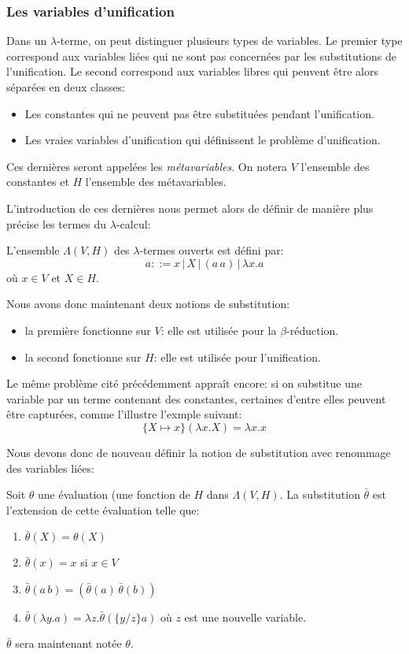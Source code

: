 \subsubsection{Les variables d’unification}

Dans un $\lambda$-terme, on peut distinguer plusieurs types de variables. Le premier type correspond aux variables liées qui ne sont pas concernées par les substitutions de l’unification. Le second correspond aux variables libres qui peuvent être alors séparées en deux classes:
\begin{itemize}
    \item Les constantes qui ne peuvent pas être substituées pendant l’unification.
    \item Les vraies variables d’unification qui définissent le problème d’unification.
\end{itemize}

Ces dernières seront appelées les \textit{métavariables}. On notera $V$ l'ensemble des constantes et $H$ l'ensemble des métavariables.

L'introduction de ces dernières nous permet alors de définir de manière plus précise les termes du $\lambda$-calcul:

\begin{defn}
L'ensemble $\Lambda(V,H)$ des $\lambda$-termes ouverts est défini par:
\[ a ::= x \,|\, X \,|\, (a \, a) \,| \,\lambda x. a\]
où $x \in V$ et $X \in H$.\\
\end{defn}

Nous avons donc maintenant deux notions de substitution:
\begin{itemize}
    \item la première fonctionne sur $V$: elle est utilisée pour la $\beta$-réduction.
    \item la second fonctionne sur $H$: elle est utilisée pour l'unification.
\end{itemize}

Le même problème cité précédemment appraît encore: si on substitue une variable par un terme contenant des constantes, certaines d'entre elles peuvent être capturées, comme l'illustre l'exmple suivant:
\[\{ X \mapsto x \}(\lambda x . X) = \lambda x . x\]

Nous devons donc de nouveau définir la notion de substitution avec renommage des variables liées:

\begin{defn}
Soit $\theta$ une évaluation (une fonction de $H$ dans $\Lambda(V,H)$. La substitution $\bar{\theta}$ est l'extension de cette évaluation telle que:
\begin{enumerate}
    \item $\bar{\theta} (X) = \theta (X)$
    \item $\bar{\theta} (x) = x$ si $x \in V$
    \item $\bar{\theta}(a \, b) = (\bar{\theta}(a) \, \bar{\theta}(b))$
    \item $\bar{\theta}(\lambda y . a) = \lambda z . \bar{\theta} (\{ y / z \} a)$ où $z$ est une nouvelle variable.
\end{enumerate}
$\bar{\theta}$ sera maintenant notée $\theta$.
\end{defn}

